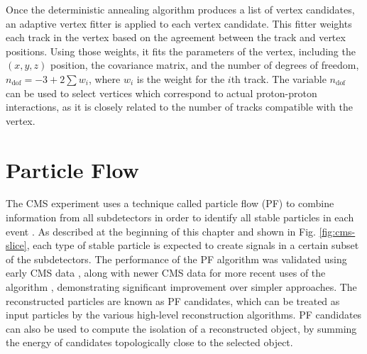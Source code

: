\documentclass[12pt]{thesis}  %
\begin{document}
Once the deterministic annealing algorithm produces a list of vertex candidates, an adaptive vertex fitter is applied to each vertex candidate. This fitter weights each track in the vertex based on the agreement between the track and vertex positions. Using those weights, it fits the parameters of the vertex, including the $(x,y,z)$ position, the covariance matrix, and the number of degrees of freedom, $n_{\text{dof}} = -3 + 2 \sum{w_i}$, where $w_i$ is the weight for the $i$th track. The variable $n_{\text{dof}}$ can be used to select vertices which correspond to actual proton-proton interactions, as it is closely related to the number of tracks compatible with the vertex.


\section{Particle Flow
\label{sec:particle-flow}}

The CMS experiment uses a technique called particle flow (PF) to combine information from all subdetectors in order to identify all stable particles in each event \cite{CMS-PAS-PFT-09-001}. As described at the beginning of this chapter and shown in Fig. \ref{fig:cms-slice}, each type of stable particle is expected to create signals in a certain subset of the subdetectors. The performance of the PF algorithm was validated using early CMS data \cite{CMS-PAS-PFT-10-002,CMS-PAS-PFT-10-003}, along with newer CMS data for more recent uses of the algorithm \cite{Beaudette:2014cea}, demonstrating significant improvement over simpler approaches. The reconstructed particles are known as PF candidates, which can be treated as input particles by the various high-level reconstruction algorithms. PF candidates can also be used to compute the isolation of a reconstructed object, by summing the energy of candidates topologically close to the selected object.
\end{document}

